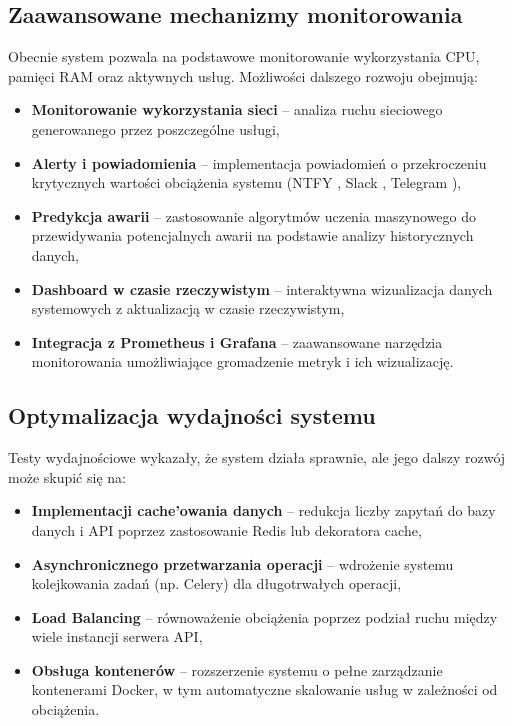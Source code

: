 \subsection{Zaawansowane mechanizmy monitorowania}
Obecnie system pozwala na podstawowe monitorowanie wykorzystania CPU, pamięci RAM oraz aktywnych usług. Możliwości dalszego rozwoju obejmują:
\begin{itemize}
    \item \textbf{Monitorowanie wykorzystania sieci} – analiza ruchu sieciowego generowanego przez poszczególne usługi,
    \item \textbf{Alerty i powiadomienia} – implementacja powiadomień o przekroczeniu krytycznych wartości obciążenia systemu (NTFY \cite{NTFY}, Slack \cite{Slack}, Telegram \cite{Telegram}),
    \item \textbf{Predykcja awarii} – zastosowanie algorytmów uczenia maszynowego do przewidywania potencjalnych awarii na podstawie analizy historycznych danych,
    \item \textbf{Dashboard w czasie rzeczywistym} – interaktywna wizualizacja danych systemowych z aktualizacją w czasie rzeczywistym,
    \item \textbf{Integracja z Prometheus i Grafana} – zaawansowane narzędzia monitorowania umożliwiające gromadzenie metryk i ich wizualizację.
\end{itemize}

\subsection{Optymalizacja wydajności systemu}
Testy wydajnościowe wykazały, że system działa sprawnie, ale jego dalszy rozwój może skupić się na:
\begin{itemize}
    \item \textbf{Implementacji cache'owania danych} – redukcja liczby zapytań do bazy danych i API poprzez zastosowanie Redis lub dekoratora cache,
    \item \textbf{Asynchronicznego przetwarzania operacji} – wdrożenie systemu kolejkowania zadań (np. Celery) dla długotrwałych operacji,
    \item \textbf{Load Balancing} – równoważenie obciążenia poprzez podział ruchu między wiele instancji serwera API,
    \item \textbf{Obsługa kontenerów} – rozszerzenie systemu o pełne zarządzanie kontenerami Docker, w tym automatyczne skalowanie usług w zależności od obciążenia.
\end{itemize}

